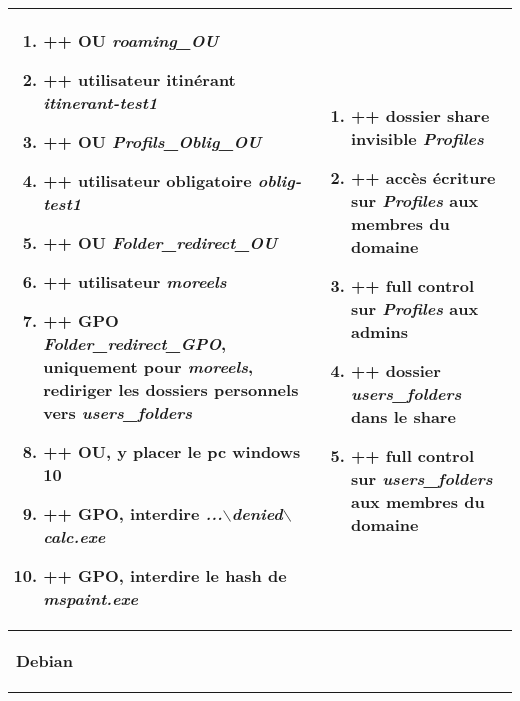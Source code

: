 \documentclass[a4paper]{article}
\begin{document}
\begin{center}
\begin{tabular}{|p{7.5cm}|p{7.5cm}|}
        \begin{enumerate}
            \item ++ OU \textit{roaming\_OU}
            \item ++ utilisateur itinérant \textit{itinerant-test1}
            \item ++ OU \textit{Profils\_Oblig\_OU}
            \item ++ utilisateur obligatoire \textit{oblig-test1}
            \item ++ OU \textit{Folder\_redirect\_OU}
            \item ++ utilisateur \textit{moreels}
            \item ++ GPO \textit{Folder\_redirect\_GPO}, uniquement pour \textit{moreels}, rediriger les dossiers personnels vers \textit{users\_folders}
            \item ++ OU, y placer le pc windows 10
            \item ++ GPO, interdire \textit{...$\backslash$denied$\backslash$calc.exe}
            \item ++ GPO, interdire le hash de \textit{mspaint.exe}
        \end{enumerate}
        &
        \begin{enumerate}
            \item ++ dossier share invisible \textit{Profiles}
            \item ++ accès écriture sur \textit{Profiles} aux membres du domaine
            \item ++ full control sur \textit{Profiles} aux admins
            \item ++ dossier \textit{users\_folders} dans le share
            \item ++ full control sur \textit{users\_folders} aux membres du domaine
        \end{enumerate}

        \\ \hline

        \multicolumn{2}{|p{15cm}|}{ \begin{center} \textbf{Debian} \end{center} }

        \\ \hline


\end{tabular}
\end{center}
\end{document}
